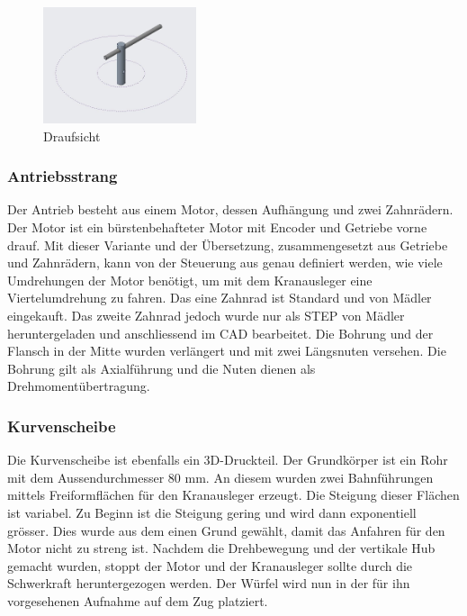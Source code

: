 \documentclass[../../main.tex]{subfiles}
\begin{document}
        \begin{figure}[H]
            \centering
            \includegraphics[width=0.4\textwidth]{../../images/Kran/Top.JPG}
            \caption {Draufsicht}
        \end{figure}



    \subsubsection{Antriebsstrang}
        Der Antrieb besteht aus einem Motor, dessen Aufhängung und zwei Zahnrädern. Der Motor ist ein bürstenbehafteter
        Motor mit Encoder und Getriebe vorne drauf. Mit dieser Variante und der Übersetzung, zusammengesetzt aus Getriebe
        und Zahnrädern, kann von der Steuerung aus genau definiert werden, wie viele Umdrehungen der Motor benötigt, um
        mit dem Kranausleger eine Viertelumdrehung zu fahren. Das eine Zahnrad ist Standard und von Mädler eingekauft.
        Das zweite Zahnrad jedoch wurde nur als STEP von Mädler heruntergeladen und anschliessend im CAD bearbeitet. Die
        Bohrung und der Flansch in der Mitte wurden verlängert und mit zwei Längsnuten versehen. Die Bohrung gilt als
        Axialführung und die Nuten dienen als Drehmomentübertragung.


        \subsubsection{Kurvenscheibe}
        Die Kurvenscheibe ist ebenfalls ein 3D-Druckteil. Der Grundkörper ist ein Rohr mit dem Aussendurchmesser 80 mm. An diesem wurden zwei Bahnführungen mittels Freiformflächen für den Kranausleger erzeugt. Die Steigung dieser Flächen ist variabel. Zu Beginn ist die Steigung gering und wird dann exponentiell grösser. Dies wurde aus dem einen Grund gewählt, damit das Anfahren für den Motor nicht zu streng ist. Nachdem die Drehbewegung und der vertikale Hub gemacht wurden, stoppt der Motor und der Kranausleger sollte durch die Schwerkraft heruntergezogen werden. Der Würfel wird nun in der für ihn vorgesehenen Aufnahme auf dem Zug platziert.
\end{document}
